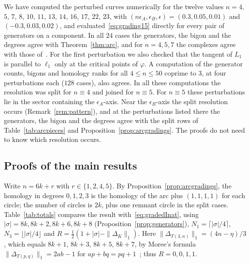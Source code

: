 \begin{remark}\label{rem:numerics}
We have computed the perturbed curves numerically for the twelve values $n=4$, $5$, $7$, $8$, $10$, $11$, $13$,
$14$, $16$, $17$, $22$, $23$, with
$(n\epsilon_A,\epsilon_B,\epsilon)=(0.3,0.05,0.01)$ and $(-0.3,0.03,0.02)$, and evaluated~\eqref{eq:grading15} directly for
every pair of generators on a component. In all $24$ cases the generators, the bigon and the degrees agree
with Theorem~\ref{thm:arc}, and
for $n=4,5,7$ the complexes agree with those of~\cite[\S\S11.2,~11.6,~11.7]{HHK2}. For the first perturbation we
also checked that the tangent of $L_1$ is parallel to $\ell_1$ only at the critical points of $\varphi$. A computation of the generator counts, bigons and homology ranks for all $4\le n\le50$ coprime to $3$, at four
perturbations each ($128$ cases), also agrees. In all these computations the resolution was split for $n\equiv4$ and
joined for $n\equiv5$. For $n\equiv5$ these perturbations lie in the sector containing the $\epsilon_A$-axis. Near the $\epsilon_B$-axis the split
resolution occurs (Remark~\ref{rem:pattern}), and at the perturbations listed there the generators, the bigon and the
degrees agree with the split rows of Table~\ref{tab:arcpieces} and Proposition~\ref{prop:arcgradings}. The proofs do not
need to know which resolution occurs.
\end{remark}

\subsection{Proofs of the main results}\label{ss:proofs}
Write $n=6k+r$ with $r\in\{1,2,4,5\}$. By Proposition~\ref{prop:arcgradings}, the homology in degrees
$0,1,2,3$ is the homology of the arc plus $(1,1,1,1)$ for each circle; the number of circles is $2k$, plus one
remnant circle in the split cases. Table~\ref{tab:totals} compares the result with~\eqref{eq:gradedInat}, using
$|\sigma|=8k,8k+2,8k+6,8k+8$ (Proposition~\ref{prop:generators}), $N_1=\lceil|\sigma|/4\rceil$, $N_3=\lfloor|\sigma|/4\rfloor$ and
$R=\frac12(1+|\sigma|-\|\Delta_K\|_1)$. Here $\|\Delta_{T(3,n)}\|_1=(4n-\eta)/3$, which equals $8k+1$, $8k+3$, $8k+5$, $8k+7$, by
Moree's formula $\|\Delta_{T(p,q)}\|_1=2ab-1$ for $ap+bq=pq+1$~\cite[Lemma~1, Cor.~1]{Moree}; thus $R=0,0,1,1$.

